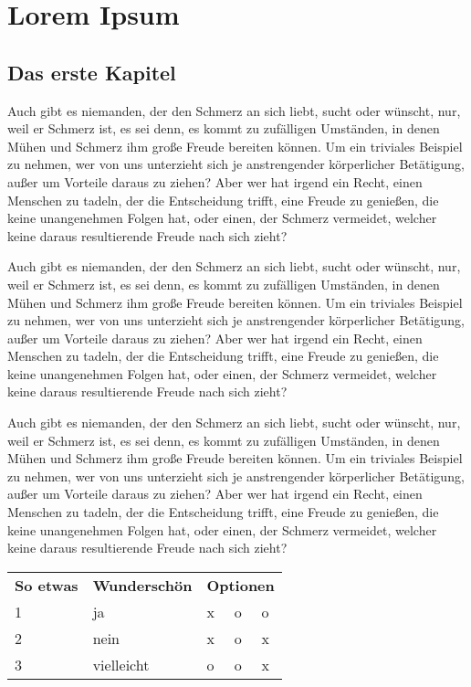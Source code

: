 \chapter{Lorem Ipsum}

\section{Das erste Kapitel}
Auch gibt es niemanden, der den Schmerz an sich liebt, sucht oder wünscht, nur, weil er Schmerz ist, es sei denn, es kommt zu zufälligen Umständen, in denen Mühen und Schmerz ihm große Freude bereiten können. Um ein triviales Beispiel zu nehmen, wer von uns unterzieht sich je anstrengender körperlicher Betätigung, außer um Vorteile daraus zu ziehen? Aber wer hat irgend ein Recht, einen Menschen zu tadeln, der die Entscheidung trifft, eine Freude zu genießen, die keine unangenehmen Folgen hat, oder einen, der Schmerz vermeidet, welcher keine daraus resultierende Freude nach sich zieht?

Auch gibt es niemanden, der den Schmerz an sich liebt, sucht oder wünscht, nur, weil er Schmerz ist, es sei denn, es kommt zu zufälligen Umständen, in denen Mühen und Schmerz ihm große Freude bereiten können. Um ein triviales Beispiel zu nehmen, wer von uns unterzieht sich je anstrengender körperlicher Betätigung, außer um Vorteile daraus zu ziehen? Aber wer hat irgend ein Recht, einen Menschen zu tadeln, der die Entscheidung trifft, eine Freude zu genießen, die keine unangenehmen Folgen hat, oder einen, der Schmerz vermeidet, welcher keine daraus resultierende Freude nach sich zieht?

Auch gibt es niemanden, der den Schmerz an sich liebt, sucht oder wünscht, nur, weil er Schmerz ist, es sei denn, es kommt zu zufälligen Umständen, in denen Mühen und Schmerz ihm große Freude bereiten können. Um ein triviales Beispiel zu nehmen, wer von uns unterzieht sich je anstrengender körperlicher Betätigung, außer um Vorteile daraus zu ziehen? Aber wer hat irgend ein Recht, einen Menschen zu tadeln, der die Entscheidung trifft, eine Freude zu genießen, die keine unangenehmen Folgen hat, oder einen, der Schmerz vermeidet, welcher keine daraus resultierende Freude nach sich zieht?

\begin{table}[]
\begin{tabular}{lllll}
\textbf{So etwas} & \textbf{Wunderschön} & \multicolumn{3}{l}{\textbf{Optionen}} \\
1                 & ja                   & x           & o          & o          \\
2                 & nein                 & x           & o          & x          \\
3                 & vielleicht           & o           & o          & x
\end{tabular}
\end{table}

